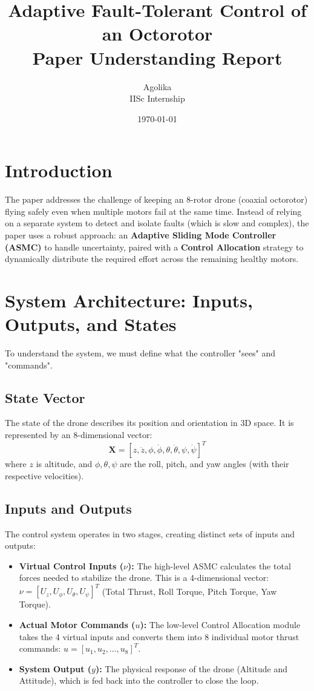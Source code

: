 \documentclass[12pt, a4paper]{article}
\title{\textbf{Adaptive Fault-Tolerant Control of an Octorotor \\ Paper Understanding Report}}
\author{Agolika \\ IISc Internship}
\date{\today}
\begin{document}
\maketitle

\section{Introduction}
The paper addresses the challenge of keeping an 8-rotor drone (coaxial octorotor) flying safely even when multiple motors fail at the same time. Instead of relying on a separate system to detect and isolate faults (which is slow and complex), the paper uses a robust approach: an \textbf{Adaptive Sliding Mode Controller (ASMC)} to handle uncertainty, paired with a \textbf{Control Allocation} strategy to dynamically distribute the required effort across the remaining healthy motors.

\section{System Architecture: Inputs, Outputs, and States}
To understand the system, we must define what the controller "sees" and "commands".

\subsection{State Vector}
The state of the drone describes its position and orientation in 3D space. It is represented by an 8-dimensional vector:
\[
\mathbf{X} = [z, \dot{z}, \phi, \dot{\phi}, \theta, \dot{\theta}, \psi, \dot{\psi}]^T
\]
where $z$ is altitude, and $\phi, \theta, \psi$ are the roll, pitch, and yaw angles (with their respective velocities). 

\subsection{Inputs and Outputs}
The control system operates in two stages, creating distinct sets of inputs and outputs:
\begin{itemize}
    \item \textbf{Virtual Control Inputs ($\nu$):} The high-level ASMC calculates the total forces needed to stabilize the drone. This is a 4-dimensional vector: $\nu = [U_z, U_\phi, U_\theta, U_\psi]^T$ (Total Thrust, Roll Torque, Pitch Torque, Yaw Torque).
    \item \textbf{Actual Motor Commands ($u$):} The low-level Control Allocation module takes the 4 virtual inputs and converts them into 8 individual motor thrust commands: $u = [u_1, u_2, \dots, u_8]^T$.
    \item \textbf{System Output ($y$):} The physical response of the drone (Altitude and Attitude), which is fed back into the controller to close the loop.
\end{itemize}
\end{document}
